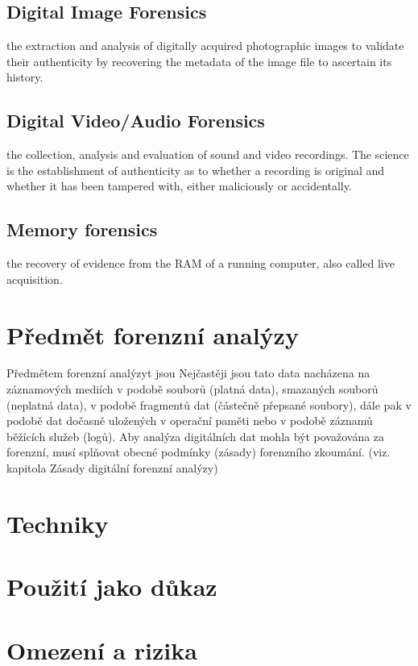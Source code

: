 \documentclass[thesis=B,czech]{FITthesis}[2012/06/26]
\begin{document}
\subsection{Digital Image Forensics }
the extraction and analysis of digitally acquired photographic images to validate their authenticity by recovering the metadata of the image file to ascertain its history.
\subsection{Digital Video/Audio Forensics}
the collection, analysis and evaluation of sound and video recordings. The science is the establishment of authenticity as to whether a recording is original and whether it has been tampered with, either maliciously or accidentally.
\subsection{Memory forensics}
the recovery of evidence from the RAM of a running computer, also called live acquisition.

\section{Předmět forenzní analýzy}

Předmětem forenzní analýzyt jsou
Nejčastěji jsou tato data nacházena na záznamových mediích v podobě
souborů (platná data), smazaných souborů (neplatná data), v podobě fragmentů
dat (částečně přepsané soubory), dále pak v podobě dat dočasně uložených
v operační paměti nebo v podobě záznamů běžících služeb (logů).
Aby analýza digitálních dat mohla být považována za forenzní, musí splňovat
obecné podmínky (zásady) forenzního zkoumání. (viz. kapitola Zásady digitální
forenzní analýzy)

\section{Techniky}

\section{Použití jako důkaz}

\section{Omezení a rizika}
\end{document}
